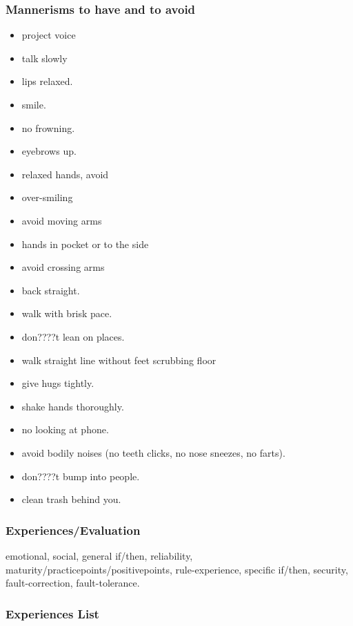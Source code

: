 \begin{frame}[label=mannerisms]
\frametitle{Mannerisms to have and to avoid} 
\begin{itemize} 
\tiny \item \tiny project voice
\item \tiny talk slowly
\item \tiny lips relaxed. 
\item \tiny smile. 
\item \tiny no frowning.
\item \tiny eyebrows up. 
\item \tiny relaxed hands, avoid
\item \tiny over-smiling
\item \tiny avoid moving arms
\item \tiny hands in pocket or to the side
\item \tiny avoid crossing arms
\item \tiny back straight.
\item \tiny walk with brisk pace.
\item \tiny don????t lean on places.
\item \tiny walk straight line without feet scrubbing floor
\item \tiny give hugs tightly.
\item \tiny shake hands thoroughly.
\item \tiny no looking at phone.
\item \tiny avoid bodily noises (no teeth clicks, no nose sneezes, no farts). 
\item \tiny don????t bump into people.
\item \tiny clean trash behind you.
\end{itemize} 
\end{frame}


\begin{frame} 


\end{frame} 
\begin{frame}[label=experiences] 
\frametitle{Experiences/Evaluation} 
{\small emotional, social, general if/then, reliability,
maturity/practicepoints/positivepoints, rule-experience, specific
if/then, security, fault-correction, fault-tolerance. } 
\end{frame} 

\begin{frame}
\frametitle{Experiences List}
\end{frame}

